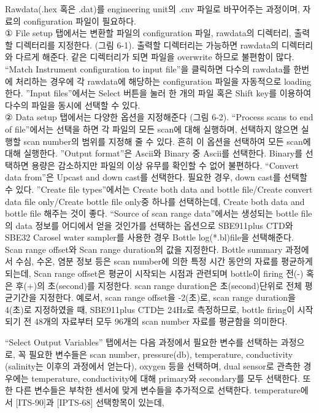 \documentclass[
]{book}
\begin{document}
Rawdata(.hex 혹은 .dat)를 engineering unit의 .cnv 파일로 바꾸어주는 과정이며, 자료의 configuration 파일이 필요하다.\\
① File setup 탭에서는 변환할 파일의 configuration 파일, rawdata의 디렉터리, 출력할 디렉터리를 지정한다. (그림 6-1). 출력할 디렉터리는 가능하면 rawdata의 디렉터리와 다르게 해준다. 같은 디렉터리가 되면 파일을 overwrite 하므로 불편함이 많다. ``Match Instrument configuration to input file''을 클릭하면 다수의 rawdata를 한번에 처리하는 경우에 각 rawdata에 해당하는 configuration 파일을 자동적으로 loading 한다. ''Input files''에서는 Select 버튼을 눌러 한 개의 파일 혹은 Shift key를 이용하여 다수의 파일을 동시에 선택할 수 있다.\\
② Data setup 탭에서는 다양한 옵션을 지정해준다 (그림 6-2). ``Process scans to end of file''에서는 선택을 하면 각 파일의 모든 scan에 대해 실행하며, 선택하지 않으면 실행할 scan number의 범위를 지정해 줄 수 있다. 흔히 이 옵션을 선택하여 모든 scan에 대해 실행한다. ''Output format''은 Ascii와 Binary 중 Ascii를 선택한다. Binary를 선택하면 용량은 감소하지만 파일의 이상 유무를 확인할 수 없어 불편하다.
``Convert data from''은 Upcast and down cast를 선택한다. 필요한 경우, down cast를 선택할 수 있다. ''Create file types''에서는 Create both data and bottle file/Create convert data file only/Create bottle file only중 하나를 선택하는데, Create both data and bottle file 해주는 것이 좋다.
``Source of scan range data''에서는 생성되는 bottle file의 data 정보를 어디에서 얻을 것인가를 선택하는 옵션으로 SBE911plus CTD와 SBE32 Carosel water sampler를 사용한 경우 Bottle log(*.bl)file을 선택해준다. Scan range offset와 Scan range duration의 값을 지정한다. Bottle summary 과정에서 수심, 수온, 염분 정보 등은 scan number에 의한 특정 시간 동안의 자료를 평균하게 되는데, Scan range offset은 평균이 시작되는 시점과 관련되며 bottle이 firing 전(-) 혹은 후(+)의 초(second)를 지정한다. scan range duration은 초(second)단위로 전체 평균기간을 지정한다. 예로서, scan range offset을 -2(초)로, scan range duration을 4(초)로 지정하였을 때, SBE911plus CTD는 24Hz로 측정하므로, bottle firing이 시작되기 전 48개의 자료부터 모두 96개의 scan number 자료를 평균함을 의미한다.

``Select Output Variables'' 탭에서는 다음 과정에서 필요한 변수를 선택하는 과정으로, 꼭 필요한 변수들은 scan number, pressure(db), temperature, conductivity (salinity는 이후의 과정에서 얻는다), oxygen 등을 선택하며, dual sensor로 관측한 경우에는 temperature, conductivity에 대해 primary와 secondary를 모두 선택한다. 또한 다른 변수들은 부착한 센서에 맞게 변수들을 추가적으로 선택한다. temperature에서 {[}ITS-90{]}과 {[}IPTS-68{]} 선택항목이 있는데,
\end{document}
